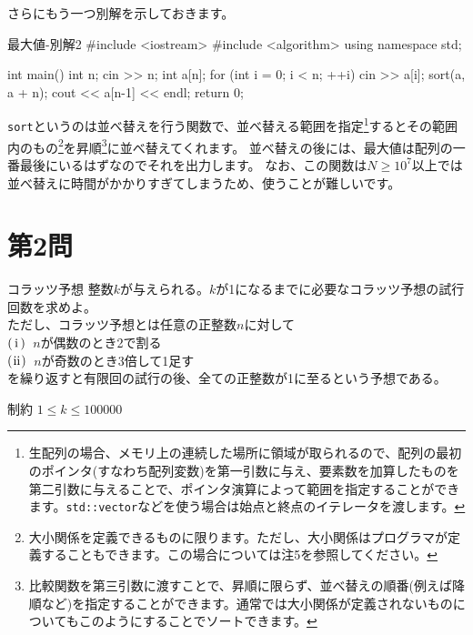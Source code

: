 \documentclass[dvipdfmx,a4j,uplatex]{jsarticle}
\renewcommand{\tt}{\texttt}
\begin{document}
    さらにもう一つ別解を示しておきます。

    \begin{code}{最大値-別解2}
#include <iostream>
#include <algorithm>
using namespace std;

int main(){
    int n;
    cin >> n;
    int a[n];
    for (int i = 0; i < n; ++i) {
        cin >> a[i];
    }
    sort(a, a + n);
    cout << a[n-1] << endl;
    return 0;
}
    \end{code}

    \tt{sort}というのは並べ替えを行う関数で、並べ替える範囲を指定\footnote{
      生配列の場合、メモリ上の連続した場所に領域が取られるので、配列の最初のポインタ(すなわち配列変数)を第一引数に与え、要素数を加算したものを第二引数に与えることで、ポインタ演算によって範囲を指定することができます。\tt{std::vector}などを使う場合は始点と終点のイテレータを渡します。
    }するとその範囲内のもの\footnote{
      大小関係を定義できるものに限ります。ただし、大小関係はプログラマが定義することもできます。この場合については注5を参照してください。
    }を昇順\footnote{
      比較関数を第三引数に渡すことで、昇順に限らず、並べ替えの順番(例えば降順など)を指定することができます。通常では大小関係が定義されないものについてもこのようにすることでソートできます。
    }に並べ替えてくれます。
    並べ替えの後には、最大値は配列の一番最後にいるはずなのでそれを出力します。
    なお、この関数は$N \geq 10^7$以上では並べ替えに時間がかかりすぎてしまうため、使うことが難しいです。


  \newpage
  \section{第2問}

    \begin{pbox}{コラッツ予想}
      整数$k$が与えられる。$k$が1になるまでに必要なコラッツ予想の試行回数を求めよ。\\
      ただし、コラッツ予想とは任意の正整数$n$に対して\\
      $\rm(\hspace{.18em}i\hspace{.18em})$\ $n$が偶数のとき2で割る\\
      $\rm(\hspace{.08em}ii\hspace{.08em})$\ $n$が奇数のとき3倍して1足す\\
      を繰り返すと有限回の試行の後、全ての正整数が1に至るという予想である。
      \begin{cbox}{制約}
        $1 \leq k \leq 100000$
      \end{cbox}
    \end{pbox}
\end{document}
